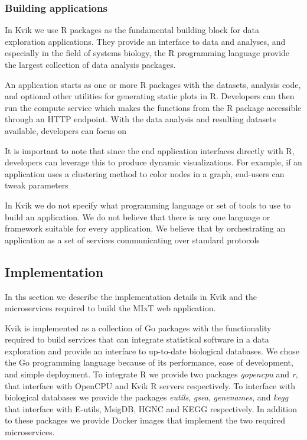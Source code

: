 \subsubsection*{Building applications} 
In Kvik we use R packages as the fundamental building block for data exploration
applications. They provide an interface to data and analyses, and especially in
the field of systems biology, the R programming language provide the largest
collection of data analysis packages. %

An application starts as one or more R packages with the datasets, analysis
code, and optional other utilities for generating static plots in R.  Developers
can then run the compute service which makes the functions from the R package
accessible through an HTTP endpoint. With the data analysis and resulting
datasets available, developers can focus on 

It is important to note that since the end application interfaces directly with
R, developers can leverage this to produce dynamic visualizations. For example,
if an application uses a clustering method to color nodes in a graph, end-users
can tweak parameters 

In Kvik we do not specify what programming language or set of tools to use to
build an application. We do not believe that there is any one language or
framework suitable for every application. We believe that by orchestrating an
application as a set of services communicating over standard protocols 


\subsection*{Implementation}
In ths section we describe the implementation details in Kvik and the
microservices required to build the MIxT web application. 

Kvik is implemented as a collection of Go packages with the
functionality required to build services that can integrate statistical
software in a data exploration and provide an interface to up-to-date biological
databases. We chose the Go programming language because of its performance, ease
of development, and simple deployment. 
To integrate R we provide two packages \emph{gopencpu} and
\emph{r}, that interface with OpenCPU and Kvik R servers respectively. To
interface with biological databases we provide the packages \emph{eutils},
\emph{gsea}, \emph{genenames}, and \emph{kegg} that interface with E-utils,
MsigDB, HGNC and KEGG respectively.
In addition to these packages we provide Docker images that implement the
two required microservices. 

